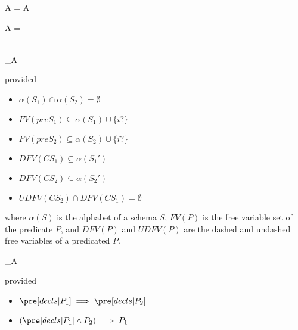 \begin{law}
  \label{true-guard-law}
  \begin{circus}
    \lcircguard \true \rcircguard \circguard A = A
  \end{circus}
\end{law}

\begin{law}
  \label{false-guard-law}
  \begin{circus}
    \lcircguard \false \rcircguard \circguard A = \Stop
  \end{circus}
\end{law}

\begin{law}
  \label{schema-seq-intro-law}
  \begin{circus}
     \\
    \circrefines_A \\
    [\Delta S_1; \Xi S_2; i? : T | preS_1 \land CS_1] 
  \end{circus}
  provided
  \begin{itemize}
  \item $\alpha(S_1) \cap \alpha(S_2) = \emptyset$
  \item $FV(preS_1) \subseteq \alpha(S_1) \cup \{i?\}$
  \item $FV(preS_2) \subseteq \alpha(S_2) \cup \{i?\}$
  \item $DFV(CS_1) \subseteq \alpha(S_1')$
  \item $DFV(CS_2) \subseteq \alpha(S_2')$
  \item $UDFV(CS_2) \cap DFV(CS_1) = \emptyset$
  \end{itemize}
  where $\alpha(S)$ is the alphabet of a schema $S$, $FV(P)$ is the
  free variable set of the predicate $P$, and $DFV(P)$ and $UDFV(P)$
  are the dashed and undashed free variables of a predicated $P$.
\end{law}

\begin{law}
  \label{schema-refinement-law}
  \begin{circus}
    \lschexpract [ decls | P_1 ] \rschexpract
    \circrefines_A
    \lschexpract [ decls | P_2 ] \rschexpract
  \end{circus}
  provided
  \begin{itemize}
  \item $\pre [ decls | P_1 ] \implies \pre [ decls | P_2 ]$
  \item $(\pre [ decls | P_1 ] \land P_2) \implies P_1$
  \end{itemize}
\end{law}

